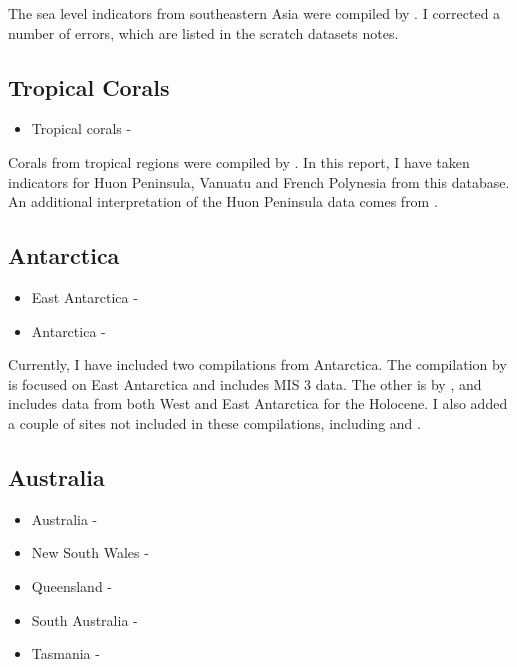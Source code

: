 The sea level indicators from southeastern Asia were compiled by \citet{MannEtal2019}. I corrected a number of errors, which are listed in the scratch datasets notes.

\subsection{Tropical Corals}

\begin{itemize}
  \item Tropical corals - \citet{HibbertEtal2016}
\end{itemize}

Corals from tropical regions were compiled by \citet{HibbertEtal2016}. In this report, I have taken indicators for Huon Peninsula, Vanuatu and French Polynesia from this database. An additional interpretation of the Huon Peninsula data comes from \citet{deGelderEtal2022}.

\subsection{Antarctica}

\begin{itemize}
  \item East Antarctica - \citet{IshiwaEtal2021}
  \item Antarctica - \citet{BriggsTarasov2013}
\end{itemize}

Currently, I have included two compilations from Antarctica. The compilation by \citet{IshiwaEtal2021} is focused on East Antarctica and includes MIS 3 data. The other is by \citet{BriggsTarasov2013}, and includes data from both West and East Antarctica for the Holocene. I also added a couple of sites not included in these compilations, including \citet{HjortEtal1997} and \citet{BraddockEtal2022}.

\subsection{Australia}

\begin{itemize}
  \item Australia - \citep{LewisEtal2013}
  \item New South Wales - \citet{SlossEtal2007}
  \item Queensland - \citet{LarcombeEtal1995}
  \item South Australia - \citet{BelperioEtal2002}
  \item Tasmania - \citet{Morrison2019}
\end{itemize}


